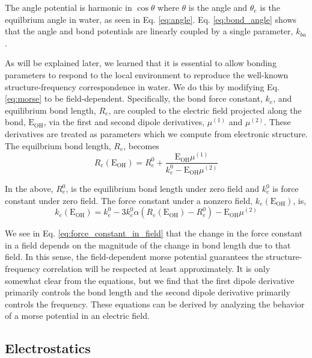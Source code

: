 \documentclass[journal=jacsat,manuscript=article]{achemso}
\begin{document}
The angle potential is harmonic in $\cos\theta$ where $\theta$ is the  angle
and $\theta_e$ is the equilbrium angle in water, as seen in Eq. \ref{eq:angle}.
Eq. \ref{eq:bond_angle} shows that the angle and bond potentials are linearly
coupled by a single parameter, $k_{ba}$.

As will be explained later, we learned that
it is essential to allow bonding parameters to respond to the local environment to reproduce
the well-known structure-frequency correspondence in water.\cite{boyer2019beyond} We do this
by modifying Eq. \ref{eq:morse} to be field-dependent. Specifically, the bond force constant, $k_e$,
and equilibrium bond length, $R_e$, are coupled to the electric field projected along the bond, $\mathrm{E_{OH}}$,
via the first and second dipole derivatives, $\mu^{(1)}$ and $\mu^{(2)}$. These derivatives
are treated as parameters which we compute from electronic structure. The equilbrium bond
length, $R_e$, becomes
\begin{equation}
  R_e(\mathrm{E_{OH}})=R_e^0+ \frac{\mathrm{E_{OH}}\mu^{(1)}}{k_e^0-\mathrm{E_{OH}}\mu^{(2)}}
  \label{eq:bond_in_field}
\end{equation}

In the above, $R_e^0$, is the equilibrium bond length under zero field and $k_e^0$ is
force constant under zero field. The force constant under a nonzero field, $k_e(\mathrm{E_{OH}})$, is,
\begin{equation}
  k_e(\mathrm{E_{OH}})=k_e^0-3k_e^0\alpha\left(R_e(\mathrm{E_{OH}})-R_e^0\right)-\mathrm{E_{OH}}\mu^{(2)}
  \label{eq:force_constant_in_field}
\end{equation}

We see in Eq. \ref{eq:force_constant_in_field} that the change in the force constant in a field depends
on the magnitude of the change in bond length due to that field. In this sense, the field-dependent
morse potential guarantees the structure-frequency correlation will be respected at least approximately.
It is only somewhat clear from the equations, but we find that the first dipole derivative
primarily controls the bond length and the second dipole derivative primarily controls the frequency.
These equations can be derived by analyzing the behavior of a morse potential in an electric field.\cite{boyer2019beyond}


\subsection*{Electrostatics}
\end{document}
